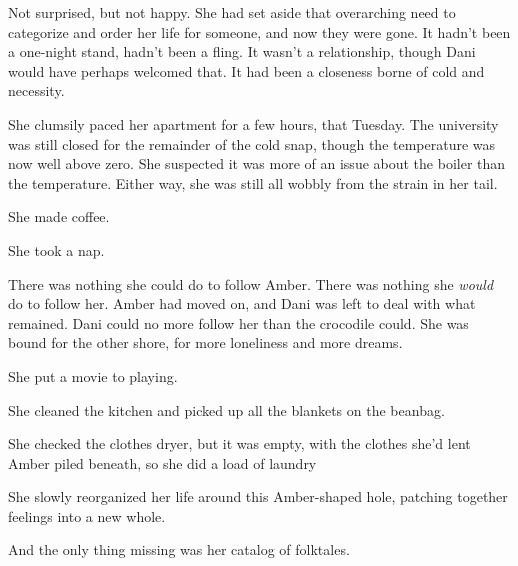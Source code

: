 Not surprised, but not happy. She had set aside that overarching need to categorize and order her life for someone, and now they were gone. It hadn't been a one-night stand, hadn't been a fling. It wasn't a relationship, though Dani would have perhaps welcomed that. It had been a closeness borne of cold and necessity.

She clumsily paced her apartment for a few hours, that Tuesday. The university was still closed for the remainder of the cold snap, though the temperature was now well above zero. She suspected it was more of an issue about the boiler than the temperature. Either way, she was still all wobbly from the strain in her tail.

She made coffee.

She took a nap.

There was nothing she could do to follow Amber. There was nothing she \emph{would} do to follow her. Amber had moved on, and Dani was left to deal with what remained. Dani could no more follow her than the crocodile could. She was bound for the other shore, for more loneliness and more dreams.

She put a movie to playing.

She cleaned the kitchen and picked up all the blankets on the beanbag.

She checked the clothes dryer, but it was empty, with the clothes she'd lent Amber piled beneath, so she did a load of laundry

She slowly reorganized her life around this Amber-shaped hole, patching together feelings into a new whole.

And the only thing missing was her catalog of folktales.
